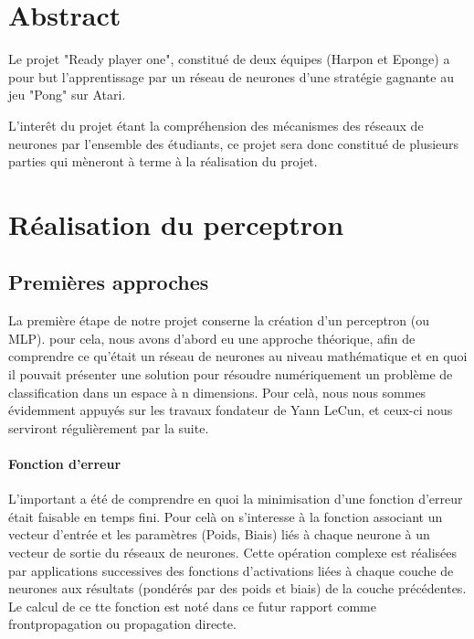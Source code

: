 \documentclass[
    10pt,
    a4paper,
    oneside,
    headinclude,footinclude,
    BCOR=5mm,
    captions=tableabove
]{scrartcl}
\title{\normalfont{\spacedallcaps{Ready-Player-One}}}
\subtitle{Rapport du groupe Harpon}
\author{Martin Lehoux, Pierre Biret \and Sacha Seksik, Loïc Audoin}
\date{\today}
\begin{document}
    
\renewcommand{\sectionmark}[1]{\markright{\spacedlowsmallcaps{#1}}}
\lehead{\mbox{\llap{\small\thepage\kern1em\color{halfgray} \vline}\color{halfgray}\hspace{0.5em}\rightmark\hfil}}
\pagestyle{scrheadings}

\maketitle
\tableofcontents

\newpage
\section*{Abstract}
Le projet "Ready player one", constitué de deux équipes (Harpon et Eponge) a pour but l'apprentissage par un réseau de neurones d'une stratégie gagnante au jeu "Pong" sur Atari.

L'interêt du projet étant la compréhension des mécanismes des réseaux de neurones par l'ensemble des étudiants, ce projet sera donc constitué de plusieurs parties qui mèneront à terme à la réalisation du projet.		

\newpage
\section{Réalisation du perceptron}

\subsection{Premières approches}
La première étape de notre projet conserne la création d'un perceptron (ou MLP). pour cela, nous avons d'abord eu une approche théorique, afin de comprendre ce qu'était un réseau de neurones au niveau mathématique et en quoi il pouvait présenter une solution pour résoudre numériquement un problème de classification dans un espace à n dimensions. Pour celà, nous nous sommes évidemment appuyés sur les travaux fondateur de Yann LeCun, et ceux-ci nous serviront régulièrement par la suite. 

\paragraph{Fonction d'erreur}
L'important a été de comprendre en quoi la minimisation d'une fonction d'erreur était faisable en temps fini. Pour celà on s'interesse à la fonction associant un vecteur d'entrée et les paramètres (Poids, Biais) liés à chaque neurone à un vecteur de sortie du réseaux de neurones. Cette opération complexe est réalisées par applications successives des fonctions d'activations liées à chaque couche de neurones aux résultats (pondérés par des poids et biais) de la couche précédentes. 
Le calcul de ce tte fonction est noté dans ce futur rapport comme frontpropagation ou propagation directe.
\end{document}
